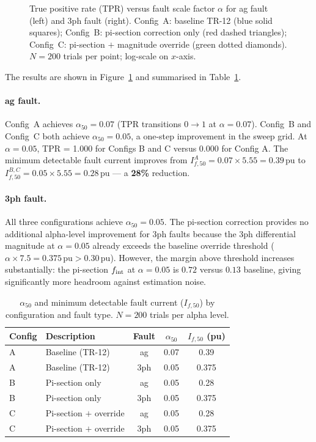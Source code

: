 \documentclass[11pt,a4paper]{article}
\newcommand{\alphafifty}{\alpha_{50}}
\newcommand{\pu}{\,\text{pu}}
\begin{document}
\begin{figure}[h]
  \centering
  
  \caption{True positive rate (TPR) versus fault scale factor $\alpha$ for
           ag fault (left) and 3ph fault (right).
           Config~A: baseline TR-12 (blue solid squares);
           Config~B: pi-section correction only (red dashed triangles);
           Config~C: pi-section $+$ magnitude override (green dotted diamonds).
           $N = 200$ trials per point; log-scale on $x$-axis.}
  \label{fig:tpr}
\end{figure}

The results are shown in Figure~\ref{fig:tpr} and summarised in
Table~\ref{tab:alpha50}.

\paragraph{ag fault.}
Config~A achieves $\alphafifty = 0.07$ (TPR transitions $0\to1$ at $\alpha=0.07$).
Config~B and Config~C both achieve $\alphafifty = 0.05$, a one-step improvement
in the sweep grid.  At $\alpha = 0.05$, TPR = 1.000 for Configs B and C versus
0.000 for Config A.  The minimum detectable fault current improves from
$I_{f,50}^A = 0.07 \times 5.55 = 0.39\pu$ to
$I_{f,50}^{B,C} = 0.05 \times 5.55 = 0.28\pu$ --- a \textbf{28\%} reduction.

\paragraph{3ph fault.}
All three configurations achieve $\alphafifty = 0.05$.  The pi-section
correction provides no additional alpha-level improvement for 3ph faults
because the 3ph differential magnitude at $\alpha=0.05$ already exceeds the
baseline override threshold ($\alpha \times 7.5 = 0.375\pu > 0.30\pu$).
However, the margin above threshold increases substantially: the pi-section
$f_{\rm int}$ at $\alpha=0.05$ is $0.72$ versus $0.13$ baseline, giving
significantly more headroom against estimation noise.

\begin{table}[h]
  \centering
  \caption{$\alphafifty$ and minimum detectable fault current ($I_{f,50}$)
           by configuration and fault type.  $N=200$ trials per alpha level.}
  \label{tab:alpha50}
  \begin{tabular}{llccc}
    \toprule
    Config & Description & Fault & $\alphafifty$ & $I_{f,50}$ (pu) \\
    \midrule
    A & Baseline (TR-12)           & ag  & 0.07 & 0.39 \\
    A & Baseline (TR-12)           & 3ph & 0.05 & 0.375 \\
    \midrule
    B & Pi-section only            & ag  & 0.05 & 0.28 \\
    B & Pi-section only            & 3ph & 0.05 & 0.375 \\
    \midrule
    C & Pi-section $+$ override    & ag  & 0.05 & 0.28 \\
    C & Pi-section $+$ override    & 3ph & 0.05 & 0.375 \\
    \bottomrule
  \end{tabular}
\end{table}
\end{document}
